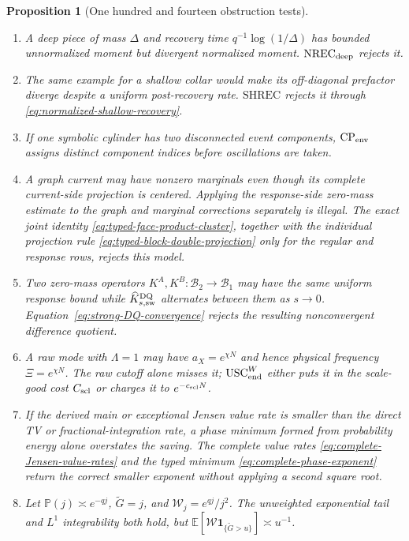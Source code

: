 \documentclass[11pt]{article}
\newtheorem{proposition}[theorem]{Proposition}
\newcommand{\cB}{\mathcal B}
\newcommand{\one}{\mathbf 1}
\begin{document}
\begin{proposition}[One hundred and fourteen obstruction tests]
\begin{enumerate}[label=\textup{(T\arabic*)}]
      the latter and never infers it from signed TV.
\item A deep piece of mass $\Delta$ and recovery time
      $q^{-1}\log(1/\Delta)$ has bounded unnormalized moment but divergent
      normalized moment.  $\mathrm{NREC}_{\rm deep}$ rejects it.
\item The same example for a shallow collar would make its off-diagonal
      prefactor diverge despite a uniform post-recovery rate.
      $\mathrm{SHREC}$ rejects it through
      \eqref{eq:normalized-shallow-recovery}.
\item If one symbolic cylinder has two disconnected event components,
      $\mathrm{CP}_{\rm env}$ assigns distinct component indices before
      oscillations are taken.
\item A graph current may have nonzero marginals even though its complete
      current-side projection is centered.  Applying the response-side
      zero-mass estimate to the graph and marginal corrections separately is
      illegal.  The exact joint identity
      \eqref{eq:typed-face-product-cluster}, together with the individual
      projection rule \eqref{eq:typed-block-double-projection} only for the
      regular and response rows, rejects this model.
\item Two zero-mass operators $K^A,K^B:\cB_2\to\cB_1$ may have the same
      uniform response bound while
      $\widehat K_{s,\rm sw}^{\rm DQ}$ alternates between them as $s\to0$.
      Equation~\eqref{eq:strong-DQ-convergence} rejects the resulting
      nonconvergent difference quotient.
\item A raw mode with $\Lambda=1$ may have $a_X=e^{\chi N}$ and hence
      physical frequency $\Xi=e^{\chi N}$.  The raw cutoff alone misses it;
      $\mathrm{USC}_{\rm end}^{W}$ either puts it in the scale-good cost
      $C_{\rm scl}$ or charges it to $e^{-c_{\rm scl}N}$.
\item If the derived main or exceptional Jensen value rate is smaller than
      the direct TV or fractional-integration rate, a phase minimum formed
      from probability energy alone overstates the saving.  The complete
      value rates \eqref{eq:complete-Jensen-value-rates} and the typed
      minimum \eqref{eq:complete-phase-exponent} return the correct smaller
      exponent without applying a second square root.
\item Let $\mathbb P(j)\asymp e^{-qj}$,
      $\widetilde G=j$, and $\mathscr W_j=e^{qj}/j^2$.  The unweighted
      exponential tail and $L^1$ integrability both hold, but
      $\mathbb E[\mathscr W\one_{\{\widetilde G>u\}}]\asymp u^{-1}$.

\end{enumerate}
\end{proposition}
\end{document}
